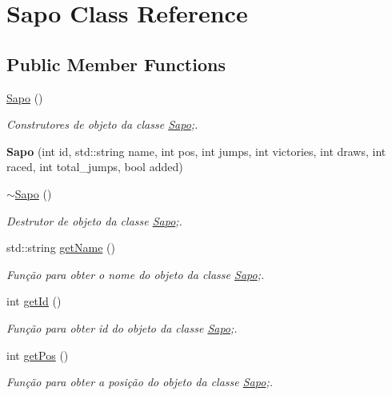 \hypertarget{class_sapo}{}\section{Sapo Class Reference}
\label{class_sapo}
\subsection*{Public Member Functions}
\begin{DoxyCompactItemize}
\item 
\mbox{\hyperlink{class_sapo_a4dfbe2759140ed6903ff3e9389eae2c3}{Sapo}} ()
\begin{DoxyCompactList}\small\item\em Construtores de objeto da classe \mbox{\hyperlink{class_sapo}{Sapo}};. \end{DoxyCompactList}\item 
\mbox{\label{class_sapo_af1e34f6e94e12d9d2f020907b26d1f77}} 
{\bfseries Sapo} (int id, std\+::string name, int pos, int jumps, int victories, int draws, int raced, int total\+\_\+jumps, bool added)
\item 
\mbox{\hyperlink{class_sapo_a3d1b73be223fc133f183e90c55d7f683}{$\sim$\+Sapo}} ()
\begin{DoxyCompactList}\small\item\em Destrutor de objeto da classe \mbox{\hyperlink{class_sapo}{Sapo}};. \end{DoxyCompactList}\item 
std\+::string \mbox{\hyperlink{class_sapo_a90b46ac8008b39dc442927f0114b67aa}{get\+Name}} ()
\begin{DoxyCompactList}\small\item\em Função para obter o nome do objeto da classe \mbox{\hyperlink{class_sapo}{Sapo}};. \end{DoxyCompactList}\item 
int \mbox{\hyperlink{class_sapo_aa33722331db1073cbd0faa58445030f9}{get\+Id}} ()
\begin{DoxyCompactList}\small\item\em Função para obter id do objeto da classe \mbox{\hyperlink{class_sapo}{Sapo}};. \end{DoxyCompactList}\item 
int \mbox{\hyperlink{class_sapo_aa46b67f81896866d31fd0105b2c01dca}{get\+Pos}} ()
\begin{DoxyCompactList}\small\item\em Função para obter a posição do objeto da classe \mbox{\hyperlink{class_sapo}{Sapo}};. \end{DoxyCompactList}\item 

\end{DoxyCompactItemize}
